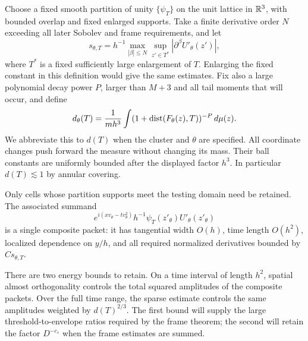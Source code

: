 Choose a fixed smooth partition of unity $\{\psi_T\}$ on the unit
lattice in $\mathbb R^3$, with bounded overlap and fixed enlarged supports.
Take a finite derivative order $N$ exceeding all later Sobolev and frame
requirements, and let
\[
 s_{\theta,T}
   =h^{-1}\max_{|\beta|\leq N}
       \sup_{z'\in T^*}|\partial^\beta U'_\theta(z')|,
\]
where $T^*$ is a fixed sufficiently large enlargement of $T$.  Enlarging
the fixed constant in this definition would give the same estimates.
Fix also a large polynomial decay power $P$, larger than $M+3$ and all
tail moments that will occur, and define
\begin{equation}\label{eq:dyadic-density}
 d_\theta(T)=\frac{1}{mh^3}
   \int(1+\operatorname{dist}(F_\theta(z),T))^{-P}\,d\mu(z).
\end{equation}
We abbreviate this to $d(T)$ when the cluster and $\theta$ are specified.
All coordinate changes push forward the measure without changing its
mass.  Their ball constants are uniformly bounded after the displayed
factor $h^3$.  In particular $d(T)\lesssim1$ by annular covering.

Only cells whose partition supports meet the testing domain need be
retained.  The associated summand
\begin{equation}\label{eq:dyadic-composite-packet}
 e^{i(xv_\theta-tv_\theta^2)}
 h^{-1}\psi_T(z'_\theta)U'_\theta(z'_\theta)
\end{equation}
is a single composite packet: it has tangential width $O(h)$, time
length $O(h^2)$, localized dependence on $y/h$, and all required
normalized derivatives bounded by $Cs_{\theta,T}$.

There are two energy bounds to retain. On a time interval of length $h^2$,
spatial almost orthogonality controls the total squared amplitudes of the
composite packets. Over the full time range, the sparse estimate controls
the same amplitudes weighted by $d(T)^{2/3}$. The first bound will supply
the large threshold-to-envelope ratios required by the frame theorem;
the second will retain the factor $D^{-c_s}$ when the frame estimates are
summed.

